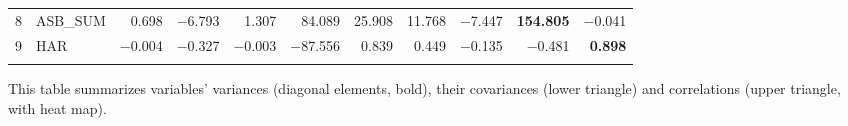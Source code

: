 {\begin{tabular}{clrrrrrrrrr}
      8     & ASB\_SUM & 0.698 & $-$6.793 & 1.307 & 84.089 & 25.908 & 11.768 & $-$7.447 & \textbf{154.805} & \cellcolor[rgb]{ 1,  .957,  .957}$-$0.041 \\
      9     & HAR   & $-$0.004 & $-$0.327 & $-$0.003 & $-$87.556 & 0.839 & 0.449 & $-$0.135 & $-$0.481 & \textbf{0.898} \\
      \phantom{9} & \phantom{PMH\_SUM} & \phantom{50,467.613} & \phantom{50,467.613} & \phantom{50,467.613} & \phantom{50,467.613} & \phantom{50,467.613} & \phantom{50,467.613} & \phantom{50,467.613} & \phantom{50,467.613} & \phantom{50,467.613}\\
      \bottomrule
      \end{tabular}
}{This table summarizes variables' variances (diagonal elements, bold), their covariances (lower triangle) and correlations (upper triangle, with heat map).}
